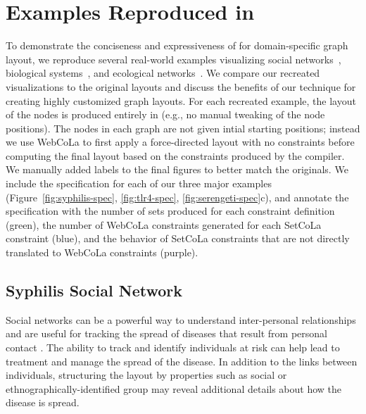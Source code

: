 \section{Examples Reproduced in \projectname}

To demonstrate the conciseness and expressiveness of \projectname for domain-specific
graph layout, we reproduce several real-world examples visualizing social 
networks~\cite{rothenberg1998using}, biological systems~\cite{barsky2008cerebral}, 
and ecological networks~\cite{kruger2017,baskerville2011spatial}. 
We compare our recreated visualizations to the original layouts and 
discuss the benefits of our technique for creating highly customized graph layouts.
For each recreated example, the layout of the nodes is produced
entirely in \projectname (e.g., no manual tweaking of the node positions).
The nodes in each graph are not given intial starting positions; instead we 
use WebCoLa to first apply a force-directed layout with no constraints 
before computing the final layout based on the constraints produced by the \projectname compiler.
We manually added labels to the final figures to better match the originals.
We include the specification for each of our three major examples 
(Figure~\ref{fig:syphilis-spec}, \ref{fig:tlr4-spec}, \ref{fig:serengeti-spec}c),
and annotate the specification with the number of sets produced for each 
constraint definition (green), the number of WebCoLa constraints generated
for each SetCoLa constraint (blue), and the behavior of SetCoLa constraints
that are not directly translated to WebCoLa constraints (purple).


\subsection{Syphilis Social Network}
\label{sec:syphilis-example}
Social networks can be a powerful way to understand inter-personal
relationships and are useful for tracking the spread of diseases that
result from personal contact \cite{rothenberg1998using,fitzpatrick2001preventable,mcelroy2003network,fu2011hiv}.
The ability to track and identify individuals at risk can help
lead to treatment and manage the spread of the disease. In
addition to the links between individuals, structuring the layout by
properties such as social or ethnographically-identified group may reveal 
additional details about how the disease is spread.

